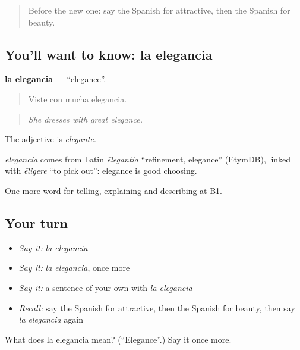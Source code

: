 \begin{quote}
Before the new one: say the Spanish for attractive, then the Spanish for beauty.
\end{quote}

\subsection*{You'll want to know: la elegancia}
\textbf{la elegancia} — \textquotedblleft{}elegance\textquotedblright{}.

\begin{quote}
Viste con mucha elegancia.
\end{quote}

\begin{quote}
\emph{She dresses with great elegance.}
\end{quote}

The adjective is \emph{elegante}.

\begin{cousinweb}
\emph{elegancia} comes from Latin \emph{ēlegantia} \textquotedblleft{}refinement, elegance\textquotedblright{} (EtymDB), linked with \emph{ēligere} \textquotedblleft{}to pick out\textquotedblright{}: elegance is good choosing.
\end{cousinweb}

\begin{grammarlens}[title={What you've built}]
One more word for telling, explaining and describing at B1.
\end{grammarlens}

\subsection*{Your turn}
\begin{itemize}
\raggedright
  \item \emph{Say it:} \emph{la elegancia}
  \item \emph{Say it:} \emph{la elegancia}, once more
  \item \emph{Say it:} a sentence of your own with \emph{la elegancia}
  \item \emph{Recall:} say the Spanish for attractive, then the Spanish for beauty, then say \emph{la elegancia} again
\end{itemize}

\begin{tcolorbox}[breakable,colback=teal!4,colframe=teal!35!black,title={Before you move on}]
What does la elegancia mean? (\textquotedblleft{}Elegance\textquotedblright{}.) Say it once more.
\end{tcolorbox}
